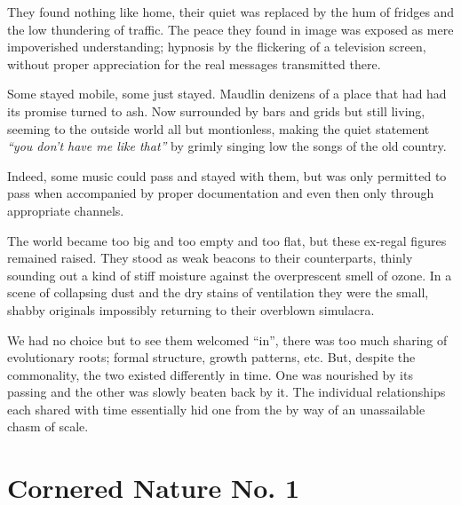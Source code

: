 \documentclass{book}
\begin{document}
They found nothing like home, their quiet was replaced by the hum of fridges
and the low thundering of traffic. The peace they found in image was exposed as
mere impoverished understanding; hypnosis by the flickering of a television
screen, without proper appreciation for the real messages transmitted there.

Some stayed mobile, some just stayed. Maudlin denizens of a place that had had
its promise turned to ash. Now surrounded by bars and grids but still living,
seeming to the outside world all but montionless, making the quiet statement
\emph{``you don't have me like that''} by grimly singing low the songs of the
old country.

Indeed, some music could pass and stayed with them, but was only permitted to
pass when accompanied by proper documentation and even then only through
appropriate channels.

The world became too big and too empty and too flat, but these ex-regal figures
remained raised. They stood as weak beacons to their counterparts, thinly
sounding out a kind of stiff moisture against the overprescent smell of ozone.
In a scene of collapsing dust and the dry stains of ventilation they were the
small, shabby originals impossibly returning to their overblown simulacra.

We had no choice but to see them welcomed ``in'', there was too much sharing of
evolutionary roots; formal structure, growth patterns, etc. But, despite the
commonality, the two existed differently in time. One was nourished by its
passing and the other was slowly beaten back by it. The individual
relationships each shared with time essentially hid one from the by way of an
unassailable chasm of scale.

\chapter{Cornered Nature No. 1}
\label{chapter:cornered-nature-1}
\end{document}
